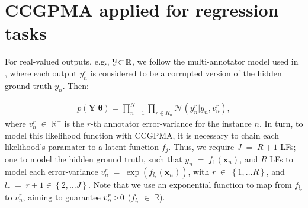 \documentclass[journal]{IEEEtran}
\providecommand{\ve}[1]{{\bm{#1}}}%
\providecommand{\mat}[1]{{\bm{#1}}} %
\newcommand{\Real}{\mathbb{R}}
\DeclareMathOperator{\en}{\!\,\in\!\,}
\DeclareMathOperator{\igual}{\!\,=\!\,}
\providecommand{\s}[1]{\negthinspace#1\negthinspace}%
\providecommand{\ve}[1]{{\mathbf{#1}}}
\providecommand{\mat}[1]{{\mathbf{#1}}}
\newcommand{\gauss}{\mathcal{N}} %
\begin{document}

\footnotesize








%
%
%
\appendices
{}

\section{CCGPMA applied for regression tasks}\label{CCGPMAReg}
For real-valued outputs, e.g., $\mathcal{Y} \s{\subset}\Real$, we follow the multi-annotator model used in \cite{raykar2010learning,groot2011learning,xiao2013learning,rodrigues2017learning}, where each output $y_n^r$ is considered to be a corrupted version of the hidden ground truth $y_n$. Then:

\begin{align}
\label{eq:RegLik}
p(\mat{Y}|{\bm{\theta}}) = \prod^N_{n=1}\prod_{r\in R_n}\gauss\left(y_n^r|y_n,v_{n}^r\right),
\end{align}
where $v_{n}^r\en\Real^+$ is the $r$-th annotator error-variance for the instance $n$. In turn, to model this likelihood function with CCGPMA, it is necessary to chain each likelihood's paramater to a latent function $f_j$. Thus, we require $J\igual R+1$ LFs; one to model the hidden ground truth, such that $y_n\igual f_1(\ve{x}_n)$, and $R$ LFs to model each error-variance $v_{n}^r\igual \exp(f_{l_r}(\ve{x}_n))$, with $r\en \left\{1, \dots R\right\}$, and $l_r \igual r+1 \in \left\{2, \dots J\right\}$. Note that we use an exponential function to map from $f_{l_r}$ to $v_{n}^r$, aiming to guarantee $v_{n}^r\s{>}0$ ($f_{l_r}\en \Real$).
\end{document}
